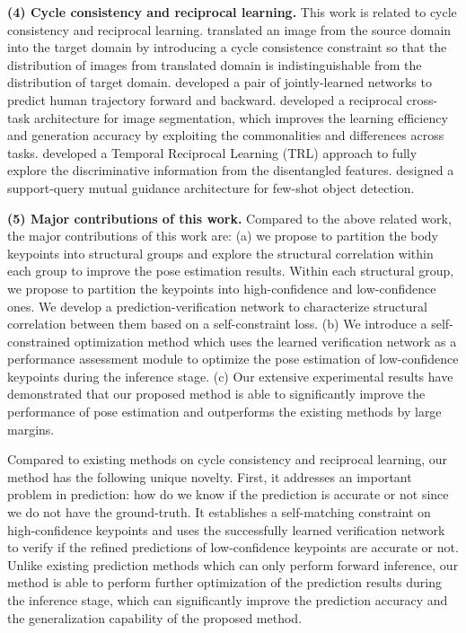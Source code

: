 \documentclass[runningheads]{llncs}
\begin{document}
\textbf{(4) Cycle consistency and reciprocal learning.}
This work is related to cycle consistency and reciprocal learning. \cite{Zhu_2017_ICCV} translated an image from the source domain into the target domain by introducing a cycle consistence constraint so that the distribution of images from translated domain is indistinguishable from the distribution of target domain. 
\cite{Sun_2020_CVPR} developed a pair of jointly-learned networks to predict human trajectory forward and backward. 
\cite{xu2020segmentation} developed a reciprocal cross-task architecture for image segmentation, which improves the learning efficiency and generation accuracy by exploiting the commonalities and differences across tasks. 
\cite{liu2021watching} developed a  Temporal Reciprocal Learning (TRL) approach to fully explore the discriminative information from the disentangled features. \cite{zhang2021accurate} designed a support-query mutual guidance architecture for few-shot object detection.

\vspace{0.2cm}
\textbf{(5) Major contributions of this work.} 
Compared to the above related work, the major contributions of this work are: (a) we propose to partition the body keypoints into structural groups and explore the structural correlation within each group to improve the pose estimation results. 
Within each structural group, we propose to partition the keypoints into high-confidence and low-confidence ones. We  develop a  prediction-verification network to characterize 
structural correlation between them based on a self-constraint loss. (b) We introduce a self-constrained  optimization method which uses the learned verification network as a performance assessment module to optimize the pose estimation of low-confidence keypoints during the inference stage. (c) Our extensive experimental results have demonstrated that our proposed method is able to significantly improve the performance of pose estimation and outperforms the existing methods by large margins. 

Compared to existing methods on cycle consistency and reciprocal learning, our  method has the following unique novelty. First, it addresses an important problem in prediction: how do we know if the prediction is accurate or not since we do not have the ground-truth. It establishes a self-matching constraint on high-confidence keypoints and uses the successfully learned verification network to verify if the refined predictions of low-confidence keypoints are accurate or not. Unlike existing prediction methods which can only perform forward inference, our method 
is able to perform further optimization of the prediction results during the inference stage, which can significantly improve the prediction accuracy and the generalization capability of the proposed method. 
\end{document}
